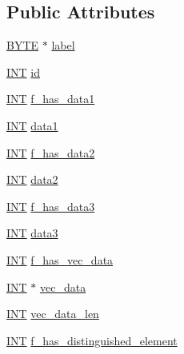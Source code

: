 \subsection*{Public Attributes}
\begin{DoxyCompactItemize}
\item 
\mbox{\hyperlink{galois_8h_ab6cc7b4aeb6ea31aba2b3fbfc83ff5e6}{B\+Y\+TE}} $\ast$ \mbox{\hyperlink{classgraph__node_adb091df18f51c4cfec146980d62c1ebe}{label}}
\item 
\mbox{\hyperlink{galois_8h_a09fddde158a3a20bd2dcadb609de11dc}{I\+NT}} \mbox{\hyperlink{classgraph__node_ae48905cdfc74fdccb1102b6b60c086b8}{id}}
\item 
\mbox{\hyperlink{galois_8h_a09fddde158a3a20bd2dcadb609de11dc}{I\+NT}} \mbox{\hyperlink{classgraph__node_aa89c5850a02043a669840da98ce1e966}{f\+\_\+has\+\_\+data1}}
\item 
\mbox{\hyperlink{galois_8h_a09fddde158a3a20bd2dcadb609de11dc}{I\+NT}} \mbox{\hyperlink{classgraph__node_a6960183866d25eebc39df8fb7d3d0c7a}{data1}}
\item 
\mbox{\hyperlink{galois_8h_a09fddde158a3a20bd2dcadb609de11dc}{I\+NT}} \mbox{\hyperlink{classgraph__node_ada7b29a0d11d88ce3d21c77fb91e654f}{f\+\_\+has\+\_\+data2}}
\item 
\mbox{\hyperlink{galois_8h_a09fddde158a3a20bd2dcadb609de11dc}{I\+NT}} \mbox{\hyperlink{classgraph__node_ac5e62dea082b93ee0f1cbfd293a82ace}{data2}}
\item 
\mbox{\hyperlink{galois_8h_a09fddde158a3a20bd2dcadb609de11dc}{I\+NT}} \mbox{\hyperlink{classgraph__node_a29fce9dc85f362f4d2a0ec1f1cf35cdd}{f\+\_\+has\+\_\+data3}}
\item 
\mbox{\hyperlink{galois_8h_a09fddde158a3a20bd2dcadb609de11dc}{I\+NT}} \mbox{\hyperlink{classgraph__node_a2f77fbf9d3993b0ab98a4a7d63e48f00}{data3}}
\item 
\mbox{\hyperlink{galois_8h_a09fddde158a3a20bd2dcadb609de11dc}{I\+NT}} \mbox{\hyperlink{classgraph__node_ac1b69088383302f89f9ff75df472d531}{f\+\_\+has\+\_\+vec\+\_\+data}}
\item 
\mbox{\hyperlink{galois_8h_a09fddde158a3a20bd2dcadb609de11dc}{I\+NT}} $\ast$ \mbox{\hyperlink{classgraph__node_af0a96507b6309328b7ae359c8b701a84}{vec\+\_\+data}}
\item 
\mbox{\hyperlink{galois_8h_a09fddde158a3a20bd2dcadb609de11dc}{I\+NT}} \mbox{\hyperlink{classgraph__node_a4279670f0cb0028370ff96e7c29f79e6}{vec\+\_\+data\+\_\+len}}
\item 
\mbox{\hyperlink{galois_8h_a09fddde158a3a20bd2dcadb609de11dc}{I\+NT}} \mbox{\hyperlink{classgraph__node_a98c99540cf1484b787275dad6a9a2bbc}{f\+\_\+has\+\_\+distinguished\+\_\+element}}

\end{DoxyCompactItemize}
